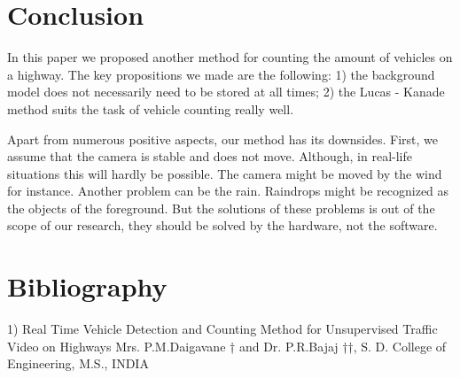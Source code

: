 \documentclass[12pt,a4paper,oneside,titlepage]{article}
\begin{document}
\newpage
\section{Conclusion}

In this paper we proposed another method for counting the amount of vehicles on a highway.
The key propositions we made are the following:
1) the background model does not necessarily need to be stored at all times;
2) the Lucas - Kanade method suits the task of vehicle counting really well. 

Apart from numerous positive aspects, our method has its downsides.
First, we assume that the camera is stable and does not move.
Although, in real-life situations this will hardly be possible.
The camera might be moved by the wind for instance.
Another problem can be the rain.
Raindrops might be recognized as the objects of the foreground.
But the solutions of these problems is out of the scope of our research, they should be solved by the hardware, not the software.



\newpage
\section{Bibliography}
1) Real Time Vehicle Detection and Counting Method for Unsupervised Traffic Video on Highways
Mrs. P.M.Daigavane † and Dr. P.R.Bajaj ††,
S. D. College of Engineering, M.S., INDIA
\end{document}
